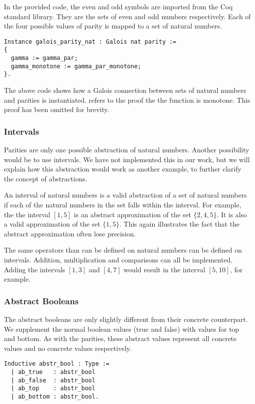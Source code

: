 In the provided code, the even and odd symbols are imported from the Coq
standard library. They are the sets of even and odd numbers respectively. Each
of the four possible values of parity is mapped to a set of natural numbers.

\begin{verbatim}
Instance galois_parity_nat : Galois nat parity :=
{
  gamma := gamma_par;
  gamma_monotone := gamma_par_monotone;
}.
\end{verbatim}

The above code shows how a Galois connection between sets of natural numbers 
and parities is instantiated.  refers to the proof the
the  function is monotone. This proof has been omitted for 
brevity.

\subsubsection{Intervals}
Parities are only one possible abstraction of natural numbers. Another
possibility would be to use intervals. We have not implemented this in our
work, but we will explain how this abstraction would work as another example,
to further clarify the concept of abstractions.

An interval of natural numbers is a valid abstraction of a set of natural
numbers if each of the natural numbers in the set falls within the interval.
For example, the the interval $[1,5]$ is an abstract approximation of the set
$\{2, 4, 5\}$. It is also a valid approximation of the set $\{1,5\}$. This
again illustrates the fact that the abstract approximation often lose 
precision.

The same operators than can be defined on natural numbers can be defined on
intervals. Addition, multiplication and comparisons can all be implemented.
Adding the intervals $[1,3]$ and $[4, 7]$ would result in the interval $[5,
10]$, for example. 

\subsubsection{Abstract Booleans}
The abstract booleans are only slightly different from their concrete
counterpart. We supplement the normal boolean values (true and false) with
values for top and bottom. As with the parities, these abstract values
represent all concrete values and no concrete values respectively.

\begin{verbatim}
Inductive abstr_bool : Type :=
  | ab_true   : abstr_bool
  | ab_false  : abstr_bool
  | ab_top    : abstr_bool
  | ab_bottom : abstr_bool.
\end{verbatim}

